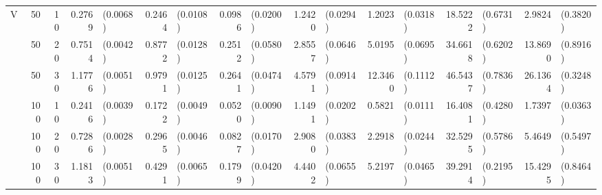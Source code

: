 \begin{landscape}
\begin{table}[H]
\begin{scriptsize}
\begin{tabular}{lrrrlrlrlrlrlrlrl}
   \hline
V & 50 & 10 & 0.2769 & (0.0068) & 0.2464 & (0.0108) & 0.0986 & (0.0200) & 1.2420 & (0.0294) & 1.2023 & (0.0318) & 18.5222 & (0.6731) & 2.9824 & (0.3820) \\ 
    & 50 & 20 & 0.7514 & (0.0042) & 0.8772 & (0.0128) & 0.2512 & (0.0580) & 2.8557 & (0.0646) & 5.0195 & (0.0695) & 34.6618 & (0.6202) & 13.8690 & (0.8916) \\ 
    & 50 & 30 & 1.1776 & (0.0051) & 0.9791 & (0.0125) & 0.2641 & (0.0474) & 4.5791 & (0.0914) & 12.3460 & (0.1112) & 46.5437 & (0.7836) & 26.1364 & (0.3248) \\ 
    & 100 & 10 & 0.2416 & (0.0039) & 0.1722 & (0.0049) & 0.0520 & (0.0090) & 1.1491 & (0.0202) & 0.5821 & (0.0111) & 16.4081 & (0.4280) & 1.7397 & (0.0363) \\ 
    & 100 & 20 & 0.7286 & (0.0028) & 0.2965 & (0.0046) & 0.0827 & (0.0170) & 2.9080 & (0.0383) & 2.2918 & (0.0244) & 32.5295 & (0.5786) & 5.4649 & (0.5497) \\ 
    & 100 & 30 & 1.1813 & (0.0051) & 0.4291 & (0.0065) & 0.1799 & (0.0420) & 4.4402 & (0.0655) & 5.2197 & (0.0465) & 39.2914 & (0.2195) & 15.4295 & (0.8464) \\ 
   \hline
\end{tabular}
\end{scriptsize}
\end{table}
\end{landscape}


